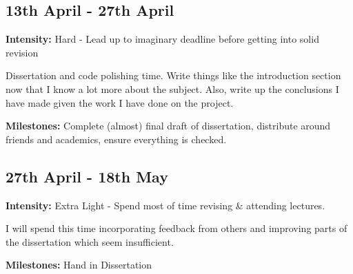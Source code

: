 \documentclass[12pt]{article}
\begin{document}
\subsection*{13th April - 27th April}
{\bf Intensity:} Hard - Lead up to imaginary deadline before getting into solid revision\par
Dissertation and code polishing time. Write things like the introduction section now that I know a lot more about the subject. Also, write up the conclusions I have made given the work I have done on the project.

{\bf Milestones:} Complete (almost) final draft of dissertation, distribute around friends and academics, ensure everything is checked.

\subsection*{27th April - 18th May}
{\bf Intensity:} Extra Light - Spend most of time revising \& attending lectures.\par
I will spend this time incorporating feedback from others and improving parts of the dissertation which seem insufficient.\par
{\bf Milestones:} Hand in Dissertation



\end{document}
